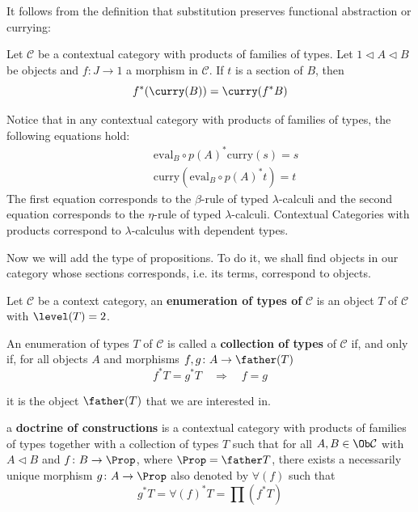 It follows from the definition that substitution preserves functional abstraction or currying:
\begin{lemma}
    Let $\mathcal{C}$ be a contextual category with products of families of types.
    Let $1 \lhd A \lhd B$ be objects and $f \colon J \to 1$ a morphism in $\mathcal{C}$.
    If $t$ is a section of $B$, then 
    \[
        f^*(\curry(B)) = \curry(f^*B) 
    \]
\end{lemma}

Notice that in any contextual category with products of families of types, the following equations hold:
\begin{align*}
    \qquad & \mathrm{eval}_B \circ p(A)^*\mathrm{curry}(s) = s \tag{$\beta$} \\[1em]
    \qquad & \mathrm{curry}(\mathrm{eval}_B \circ p(A)^*t) = t \tag{$\eta$}
\end{align*}
The first equation corresponds to the $\beta$-rule of typed $\lambda$-calculi 
and the second equation corresponds to the $\eta$-rule of typed $\lambda$-calculi.
Contextual Categories with products correspond to $\lambda$-calculus with dependent types.

Now we will add the type of propositions. To do it, we shall find objects in our category whose 
sections corresponds, i.e. its terms, correspond to objects.
\begin{definition}
    Let $\mathcal{C}$ be a context category, an \textbf{enumeration of types of} $\mathcal{C}$
    is an object $T$ of $\mathcal{C}$ with $\level(T)=2$.

    An enumeration of types $T$ of $\mathcal{C}$ is called a \textbf{collection of types} of $\mathcal{C}$
    if, and only if, for all objects $A$ and morphisms $f, g \colon A \to \father(T)$
    \[
        f^*T = g^*T \quad \Longrightarrow \quad f = g
    \]
\end{definition}
it is the object $\father(T)$ that we are interested in.

\begin{definition}
    a \textbf{doctrine of constructions} is a contextual category with products of families of types
    together with a collection of types $T$ such that for all $A, B \in \Ob \mathcal{C}$ with 
    $A \lhd B$ and $f \colon B \to \Prop$, where $\Prop = \father T$, 
    there exists a necessarily unique morphism $g \colon A \to \Prop$ also denoted by $\forall(f)$
    such that
    \[
        g^*T = \forall(f)^*T = \prod(f^*T)
    \]
\end{definition}

